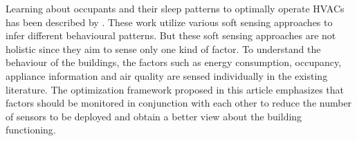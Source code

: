 \documentclass[]{interact}
\theoremstyle{plain}%
\theoremstyle{definition}
\theoremstyle{remark}
\begin{document}
Learning about occupants and their sleep patterns to optimally operate HVACs has been described by \cite{lu}. 
These work utilize various soft sensing approaches to infer different behavioural patterns.
But these soft sensing approaches are not holistic since they aim to sense only one kind of factor.  
To understand the behaviour of the buildings, the factors such as energy  consumption, occupancy, appliance information and air quality are sensed individually in the existing literature.
The optimization framework proposed in this article emphasizes that factors should be monitored in conjunction with each other to reduce the number of sensors to be deployed and obtain a better view about the building functioning.
\end{document}
